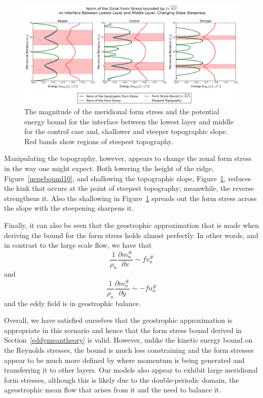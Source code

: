 \documentclass[12pt,a4paper]{report}
\newcommand*\nthkres[1]{{#1}^{\#}}
\newcommand*\figref[1]{Figure~\ref{#1}}
\newcommand*\secref[1]{Section~\ref{#1}}
\newcommand*{\partialdiff}[2][{}]{\frac{\partial #1}{\partial #2}}
\begin{document}
  \begin{figure}
  	\centering
  	\includegraphics[width=\linewidth]{uepebound_2_0}
  	\caption{ The magnitude of the meridional form stress and the potential energy bound for the
  		interface between
  		the lowest layer and middle for the control case and, shallower and steeper topographic slope.  Red bands show regions of steepest topography.}
  	\label{uepebound20}
  \end{figure}
  
    Manipulating the topography, however, appears to change the zonal form stress in the
    way one might expect. Both lowering the height of the ridge, \figref{uepebound10},
    and shallowing the topographic slope, \figref{uepebound20}, reduces the kink that
    occurs at the point of steepest topography; meanwhile, the reverse strengthens it.
    Also the shallowing in \figref{uepebound20} spreads out the form stress across
    the slope with the steepening sharpens it.
  
Finally, it can also be seen that the geostrophic approximation that is made when
deriving the bound for the form stress holds almost perfectly. In other words, and
in contrast to the large scale flow, we have that 
\begin{equation}
\frac{1}{\rho_{n}}\partialdiff[\nthkres{m}_n]{x}
\sim{f}\nthkres{v}_n
\end{equation}
and 
\begin{equation}
\frac{1}{\rho_{n}}\partialdiff[\nthkres{m}_n]{y}
\sim-{f}\nthkres{u}_n
\end{equation} 
and the eddy field is in geostrophic balance.

Overall, we have satisfied ourselves that the geostrophic approximation is appropriate
in this scenario and hence that the form stress bound derived in \secref{eddymeantheory}
is valid. However, unlike the kinetic energy bound on the Reynolds stresses, the bound
is much less constraining and the form stresses appear to be much more defined by
where momentum is being generated and transferring it to other layers. Our models also
appear to exhibit large meridional form stresses, although this is likely due to the 
double-periodic domain, the ageostrophic mean flow that arises from it and the need to
balance it.
\end{document}
